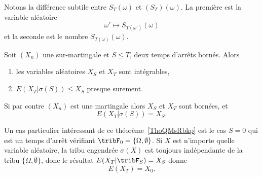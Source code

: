 \begin{remark}
    Notons la différence subtile entre \( S_T(\omega)\) et \( (S_T)(\omega)\). La première est la variable aléatoire
    \begin{equation}
        \omega'\mapsto S_{T(\omega')}(\omega)
    \end{equation}
    et la seconde est le nombre \( S_{T(\omega)}(\omega)\).
\end{remark}

\begin{theorem}   \label{ThoQMsRbkp}
    Soit \( (X_n)\) une sur-martingale et \( S\leq T\), deux temps d'arrêts bornés. Alors
    \begin{enumerate}
        \item
            les variables aléatoires \( X_{S}\) et \( X_{T}\) sont intégrables,
        \item
            \( E(X_{T}|  \sigma(S) )\leq X_{S}\) presque surement.
    \end{enumerate}
    Si par contre \( (X_n)\) est une martingale alors \( X_{S}\) et \( X_{T}\) sont bornées, et
    \begin{equation}
        E(X_{T}|\sigma(S))=X_{S}.
    \end{equation}
\end{theorem}
\begin{remark}  \label{RemKCdpnid}
Un cas particulier intéressant de ce théorème~\ref{ThoQMsRbkp} est le cas \( S=0\) qui est un temps d'arrêt vérifiant \( \tribF_0=\{ \Omega,\emptyset \}\). Si \( X\) est n'importe quelle variable aléatoire, la tribu engendrée \( \sigma(X)\) est toujours indépendante de la tribu \( \{ \Omega,\emptyset \}\), donc le résultat $E(X_T|\tribF_S)=X_S$ donne
\begin{equation}
    E(X_T)=X_0.
\end{equation}
\end{remark}

